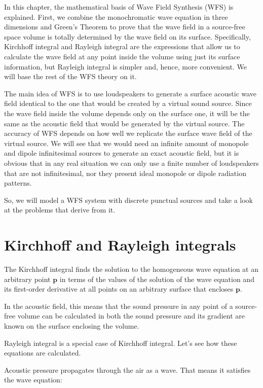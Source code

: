 In this chapter, the mathematical basis of Wave Field Synthesis (WFS) is explained. First, we combine the monochromatic wave equation in three dimensions and Green's Theorem to prove that the wave field in a source-free space volume is totally determined by the wave field on its surface. Specifically, Kirchhoff integral and Rayleigh integral are the expressions that allow us to calculate the wave field at any point inside the volume using just its surface information, but Rayleigh integral is simpler and, hence, more convenient. We will base the rest of the WFS theory on it.

The main idea of WFS is to use loudspeakers to generate a surface acoustic wave field identical to the one that would be created by a virtual sound source. Since the wave field inside the volume depends only on the surface one, it will be the same as the acoustic field that would be generated by the virtual source. The accuracy of WFS depends on how well we replicate the surface wave field of the virtual source. We will see that we would need an infinite amount of monopole and dipole infinitesimal sources to generate an exact acoustic field, but it is obvious that in any real situation we can only use a finite number of loudspeakers that are not infinitesimal, nor they present ideal monopole or dipole radiation patterns. 

So, we will model a WFS system with discrete punctual sources and take a look at the problems that derive from it.



\section{Kirchhoff and Rayleigh integrals}

The Kirchhoff integral finds the solution to the homogeneous wave equation at an arbitrary point $\mathbf{p}$ in terms of the values of the solution of the wave equation and its first-order derivative at all points on an arbitrary surface that encloses $\mathbf{p}$.

In the acoustic field, this means that the sound pressure in any point of a source-free volume can be calculated in both the sound pressure and its gradient are known on the surface enclosing the volume. 

Rayleigh integral is a special case of Kirchhoff integral. Let's see how these equations are calculated.

Acoustic pressure propagates through the air as a wave. That means it satisfies the wave equation:

